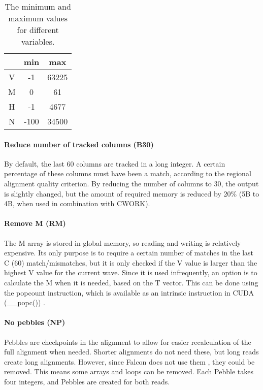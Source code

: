 \documentclass[../thesis.tex]{subfiles}
\begin{document}
\begin{table}
\caption{The minimum and maximum values for different variables.}
\label{tbl:value_range}
\centering
\begin{tabular}{c|c c}
& min & max \\ \hline
V & -1 & 63225 \\
M & 0 & 61 \\
H & -1 & 4677 \\
N & -100 & 34500 \\
\end{tabular}
\end{table}


\paragraph{Reduce number of tracked columns (B30)}
By default, the last 60 columns are tracked in a long integer.
A certain percentage of these columns must have been a match, according to the regional alignment quality criterion.
By reducing the number of columns to 30, the output is slightly changed, but the amount of required memory is reduced by 20\% (5B to 4B, when used in combination with CWORK).

\paragraph{Remove M (RM)}
The M array is stored in global memory, so reading and writing is relatively expensive.
Its only purpose is to require a certain number of matches in the last C (60) match/mismatches, but it is only checked if the V value is larger than the highest V value for the current wave.
Since it is used infrequently, an option is to calculate the M when it is needed, based on the T vector.
This can be done using the popcount instruction, which is available as an intrinsic instruction in CUDA (\_\_popc()) \cite{CUDA_math}. 

\paragraph{No pebbles (NP)}
Pebbles are checkpoints in the alignment to allow for easier recalculation of the full alignment when needed.
Shorter alignments do not need these, but long reads create long alignments.
However, since Falcon does not use them \cite{Falcon}, they could be removed.
This means some arrays and loops can be removed.
Each Pebble takes four integers, and Pebbles are created for both reads.
\end{document}
